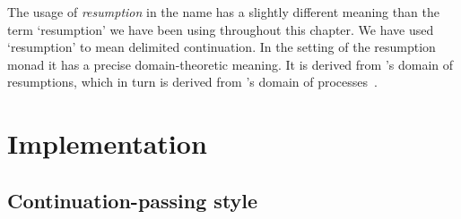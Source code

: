 \documentclass[12pt,phd,lfcs,twoside,openright,logo,leftchapter,normalheadings]{infthesis}
\theoremstyle{plain}
\theoremstyle{definition}
\begin{document}
The usage of \emph{resumption} in the name has a slightly different
meaning than the term `resumption' we have been using throughout this
chapter. We have used `resumption' to mean delimited continuation. In
the setting of the resumption monad it has a precise domain-theoretic
meaning. It is derived from \citeauthor{Plotkin76}'s domain of
resumptions, which in turn is derived from \citeauthor{Milner75}'s
domain of processes~\cite{Milner75,Plotkin76}.


\part{Implementation}

\chapter{Continuation-passing style}
\label{ch:cps}
\end{document}
